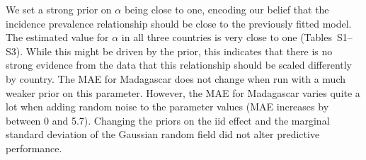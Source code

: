 \documentclass{statsoc}
\begin{document}
We set a strong prior on $\alpha$ being close to one, encoding our belief that the incidence prevalence relationship should be close to the previously fitted model.
The estimated value for $\alpha$ in all three countries is very close to one (Tables~S1--S3).
While this might be driven by the prior, this indicates that there is no strong evidence from the data that this relationship should be scaled differently by country.
The MAE for Madagascar does not change when run with a much weaker prior on this parameter.
However, the MAE for Madagascar varies quite a lot when adding random noise to the parameter values (MAE increases by between 0 and 5.7).
Changing the priors on the iid effect and the marginal standard deviation of the Gaussian random field did not alter predictive performance.




\end{document}
